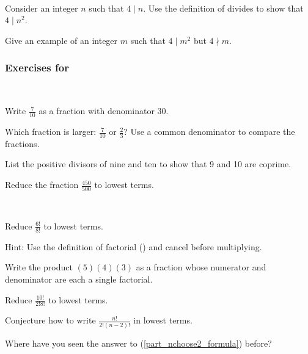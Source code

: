 \begin{exer}[\exerE] %
\label{exer_divides_square}  
~
    \begin{exerpart}
        \item Consider an integer $n$ such that $4 \mid n$.  Use the definition of divides to show that $4 \mid n^2$.
        \item Give an example of an integer $m$ such that $4 \mid m^2$ but $4 \nmid m$.
    \end{exerpart}
\end{exer}


\subsubsection*{Exercises for  \subfractions}

\begin{exer} [\exerP] %
\label{exer_equal_fractions}
~
    \begin{exerpart}
        \item Write $\frac{7}{10}$ as a fraction with denominator 30.
        \item Which fraction is larger: $\frac{7}{10}$ or $\frac{2}{3}$?  Use a common denominator to compare the fractions.
        \item List the positive divisors of nine and ten to show that 9 and 10 are coprime.
        \item Reduce the fraction $\frac{450}{500}$ to lowest terms.
    \end{exerpart}
\end{exer}

\begin{exer} [\exerU] %
\label{exer_reduce_fraction_factorials}
~
    \begin{exerpart}
        \item Reduce $\displaystyle \frac{6!}{8!}$ to lowest terms.
        
        Hint: Use the definition of factorial () and cancel before multiplying.
        \item Write the product $(5)(4)(3)$ as a fraction whose numerator and denominator are each a single factorial.
         \item Reduce $\displaystyle \frac{10!}{2!8!}$ to lowest terms.
        \item \label{part_nchoose2_formula} Conjecture how to write $\displaystyle \frac{n!}{2!(n-2)!}$ in lowest terms.
        \item Where have you seen the answer to (\ref{part_nchoose2_formula}) before?
    \end{exerpart}
\end{exer}

